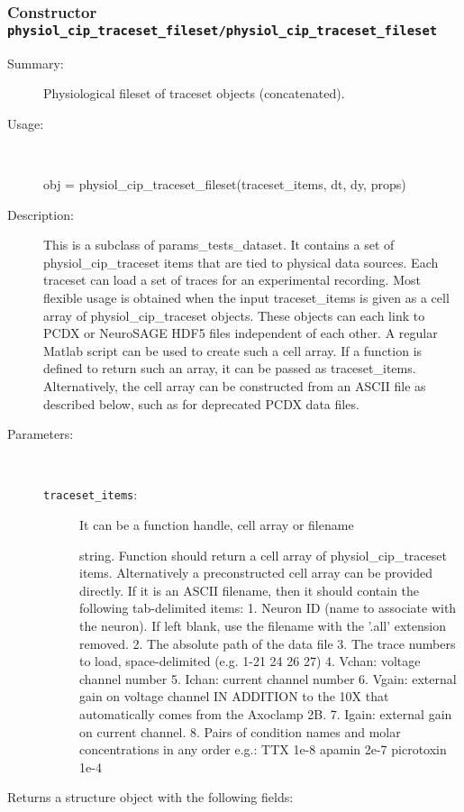 \subsubsection[Constructor \texttt{physiol\_cip\_traceset\_fileset}]{Constructor \texttt{physiol\_cip\_traceset\_fileset/physiol\_cip\_traceset\_fileset}}%
%
\label{ref_physiol_cip_traceset_fileset__physiol_cip_traceset_fileset}%
\hypertarget{ref_physiol_cip_traceset_fileset__physiol_cip_traceset_fileset}{}%
\begin{description}
\item[Summary:]Physiological fileset of traceset objects (concatenated).
%
\item[Usage:]~%
\begin{lyxcode}%
obj = physiol\_cip\_traceset\_fileset(traceset\_items, dt, dy, props)
%
\end{lyxcode}%
%
\item[Description:]%
This is a subclass of params\_tests\_dataset. It contains a set of
 physiol\_cip\_traceset items that are tied to physical data sources. Each
 traceset can load a set of traces for an experimental recording. Most
 flexible usage is obtained when the input traceset\_items is given as a
 cell array of physiol\_cip\_traceset objects. These objects can each link to
 PCDX or NeuroSAGE HDF5 files independent of each other. A regular Matlab
 script can be used to create such a cell array. If a function is defined
 to return such an array, it can be passed as
 traceset\_items. Alternatively, the cell array can be constructed from an
 ASCII file as described below, such as for deprecated PCDX data files.
\item[Parameters:]~
\begin{description}%
\item[\texttt{traceset\_items}:]
 It can be a function handle, cell array or filename

string. Function should return a cell array of physiol\_cip\_traceset
items. Alternatively a preconstructed cell array can be provided directly.
If it is an ASCII filename, then it should contain the following tab-delimited items:
1. Neuron ID (name to associate with the neuron). If left blank, use
the filename with the '.all' extension removed.
2. The absolute path of the data file
3. The trace numbers to load, space-delimited (e.g. 1-21 24 26 27)
4. Vchan: voltage channel number
5. Ichan: current channel number
6. Vgain: external gain on voltage channel IN ADDITION to the 10X that
automatically comes from the Axoclamp 2B.
7. Igain: external gain on current channel.
8. Pairs of condition names and molar concentrations in any order
e.g.: TTX       1e-8    apamin  2e-7    picrotoxin      1e-4
\end{description}%
%
\item[Returns a structure object with the following fields:
]~


\end{description}
